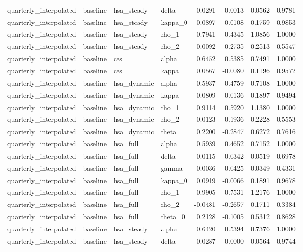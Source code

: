 \begin{tabular}{llllrrrr}
quarterly\_interpolated & baseline & hsa\_steady & delta & 0.0291 & 0.0013 & 0.0562 & 0.9781 \\
quarterly\_interpolated & baseline & hsa\_steady & kappa\_0 & 0.0897 & 0.0108 & 0.1759 & 0.9853 \\
quarterly\_interpolated & baseline & hsa\_steady & rho\_1 & 0.7941 & 0.4345 & 1.0856 & 1.0000 \\
quarterly\_interpolated & baseline & hsa\_steady & rho\_2 & 0.0092 & -0.2735 & 0.2513 & 0.5547 \\
quarterly\_interpolated & baseline & ces & alpha & 0.6452 & 0.5385 & 0.7491 & 1.0000 \\
quarterly\_interpolated & baseline & ces & kappa & 0.0567 & -0.0080 & 0.1196 & 0.9572 \\
quarterly\_interpolated & baseline & hsa\_dynamic & alpha & 0.5937 & 0.4759 & 0.7108 & 1.0000 \\
quarterly\_interpolated & baseline & hsa\_dynamic & kappa & 0.0809 & -0.0136 & 0.1897 & 0.9494 \\
quarterly\_interpolated & baseline & hsa\_dynamic & rho\_1 & 0.9114 & 0.5920 & 1.1380 & 1.0000 \\
quarterly\_interpolated & baseline & hsa\_dynamic & rho\_2 & 0.0123 & -0.1936 & 0.2228 & 0.5553 \\
quarterly\_interpolated & baseline & hsa\_dynamic & theta & 0.2200 & -0.2847 & 0.6272 & 0.7616 \\
quarterly\_interpolated & baseline & hsa\_full & alpha & 0.5939 & 0.4652 & 0.7152 & 1.0000 \\
quarterly\_interpolated & baseline & hsa\_full & delta & 0.0115 & -0.0342 & 0.0519 & 0.6978 \\
quarterly\_interpolated & baseline & hsa\_full & gamma & -0.0036 & -0.0425 & 0.0349 & 0.4331 \\
quarterly\_interpolated & baseline & hsa\_full & kappa\_0 & 0.0919 & -0.0066 & 0.1891 & 0.9678 \\
quarterly\_interpolated & baseline & hsa\_full & rho\_1 & 0.9905 & 0.7531 & 1.2176 & 1.0000 \\
quarterly\_interpolated & baseline & hsa\_full & rho\_2 & -0.0481 & -0.2657 & 0.1711 & 0.3384 \\
quarterly\_interpolated & baseline & hsa\_full & theta\_0 & 0.2128 & -0.1005 & 0.5312 & 0.8628 \\
quarterly\_interpolated & baseline & hsa\_steady & alpha & 0.6420 & 0.5394 & 0.7376 & 1.0000 \\
quarterly\_interpolated & baseline & hsa\_steady & delta & 0.0287 & -0.0000 & 0.0564 & 0.9744 \\

\end{tabular}
